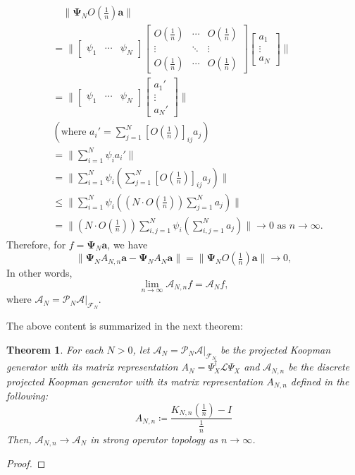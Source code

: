 \documentclass{article}[11]
\newtheorem{theorem}{Theorem}
\begin{document}
	\begin{align*}
		&\quad \|\mathbf{\Psi}_N O(\tfrac{1}{n})\mathbf{a}\| \\
		&= \|
		\begin{bmatrix}
			\psi_1 & \cdots & \psi_N
		\end{bmatrix}
		\begin{bmatrix}
			O(\tfrac{1}{n}) & \cdots & O(\tfrac{1}{n}) \\
			\vdots & \ddots & \vdots \\
			O(\tfrac{1}{n}) & \cdots & O(\tfrac{1}{n})
		\end{bmatrix}
		\begin{bmatrix}
			a_1 \\
			\vdots \\
			a_N
		\end{bmatrix} \| \\
		&= \|
		\begin{bmatrix}
			\psi_1 & \cdots & \psi_N
		\end{bmatrix}
		\begin{bmatrix}
			a_1' \\
			\vdots \\
			a_N'
		\end{bmatrix} \| \\
		&(\text{where $a_i'=\sum_{j=1}^N [O(\tfrac{1}{n})]_{ij}a_j$}) \\
		&= \| \sum_{i=1}^N \psi_i a_i' \| \\
		&= \| \sum_{i=1}^N \psi_i \left( \sum_{j=1}^N [O(\tfrac{1}{n})]_{ij}a_j \right) \| \\
		&\leq \| \sum_{i=1}^N \psi_i \left( \left(N \cdot O(\tfrac{1}{n})\right) \sum_{j=1}^N a_j \right) \| \\
		&= \| \left(N \cdot O(\tfrac{1}{n})\right) \sum_{i,j=1}^N \psi_i \left( \sum_{i,j=1}^N a_j \right) \| \to 0 \text{ as } n\to\infty.
	\end{align*}
	Therefore, for $f=\mathbf{\Psi}_N\mathbf{a}$, we have
	$$
	\| \mathbf{\Psi}_N A_{N,n} \mathbf{a} - \mathbf{\Psi}_N A_N \mathbf{a} \| = \|\mathbf{\Psi}_N O(\tfrac{1}{n})\mathbf{a}\| \to 0,
	$$ 
	In other words,
	$$
	\lim_{n\to\infty} \mathcal{A}_{N,n} f = \mathcal{A}_N f,
	$$
	where $\mathcal{A}_N = \mathcal{P}_N \mathcal{A}|_{\mathcal{F}_N}$.
	
	The above content is summarized in the next theorem:
	
	\begin{theorem}
		For each $N>0$, let $\mathcal{A}_N = \mathcal{P}_N \mathcal{A}|_{\mathcal{F}_N}$ be the projected Koopman generator with its matrix representation $A_N = \Psi_X^{\dagger}\mathcal{L}\Psi_X$ and $\mathcal{A}_{N,n}$ be the discrete projected Koopman generator with its matrix representation $A_{N,n}$ defined in the following: 
		\begin{equation*}
			A_{N,n} \coloneqq \frac{ K_{N,n}\left( \tfrac{1}{n} \right)  - I }{\tfrac{1}{n}}
		\end{equation*}
		Then, $\mathcal{A}_{N,n} \to \mathcal{A}_N$ in strong operator topology as $n\to\infty$.
	\end{theorem}
	\begin{proof}		
	\end{proof}
	
\end{document}
